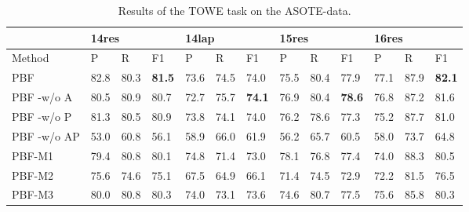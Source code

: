 \documentclass[11pt]{article}
\begin{document}
\begin{table*}
	\centering
	\begin{tabular}{|l|l|l|l|l|l|l|l|l|l|l|l|l|}
		\hline
		& \multicolumn{3}{l|}{14res}  & \multicolumn{3}{l|}{14lap}  & \multicolumn{3}{l|}{15res}  & \multicolumn{3}{l|}{16res}  \\ \hline
		Method      & P    & R    & F1            & P    & R    & F1            & P    & R    & F1            & P    & R    & F1            \\ \hline
		PBF         & 82.8 & 80.3 & \textbf{81.5} & 73.6 & 74.5 & 74.0            & 75.5 & 80.4 & 77.9          & 77.1 & 87.9 & \textbf{82.1} \\ \hline
		PBF -w/o A  & 80.5 & 80.9 & 80.7          & 72.7 & 75.7 & \textbf{74.1} & 76.9 & 80.4 & \textbf{78.6} & 76.8 & 87.2 & 81.6          \\ \hline
		PBF -w/o P  & 81.3 & 80.5 & 80.9          & 73.8 & 74.1 & 74.0            & 76.2 & 78.6 & 77.3          & 75.2 & 87.7 & 81.0            \\ \hline
		PBF -w/o AP & 53.0   & 60.8 & 56.1          & 58.9 & 66.0   & 61.9          & 56.2 & 65.7 & 60.5          & 58.0   & 73.7 & 64.8          \\ \hline
		PBF-M1      & 79.4 & 80.8 & 80.1          & 74.8 & 71.4 & 73.0            & 78.1 & 76.8 & 77.4          & 74.0   & 88.3 & 80.5          \\ \hline
		PBF-M2      & 75.6 & 74.6 & 75.1          & 67.5 & 64.9 & 66.1          & 71.4 & 74.5 & 72.9          & 72.2 & 81.5 & 76.5          \\ \hline
		PBF-M3      & 80.0   & 80.8 & 80.3          & 74.0   & 73.1 & 73.6          & 74.6 & 80.7 & 77.5          & 75.6 & 85.8 & 80.3          \\ \hline
	\end{tabular}
	\caption{\label{table:TOWE-ASOTE-data-prf} Results of the TOWE task on the ASOTE-data. }
\end{table*}
\end{document}
